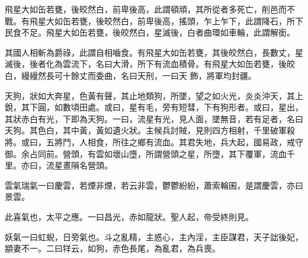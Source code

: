 \begin{pinyinscope}
 飛星大如缶若甕，後皎然白，前卑後高，此謂頓頑，其所從者多死亡，削邑而不戰。有飛星大如缶若甕，後皎然白，前卑後高，搖頭，乍上乍下，此謂降石，所下民食不足。飛星大如缶若甕，後皎然白，星滅後，白者曲環如車輪，此謂解銜。



 其國人相斬為爵祿，此謂自相嚙食。有飛星大如缶若甕，其後皎然白，長數丈，星滅後，後者化為雲流下，名曰大滑，所下有流血積骨。有飛星大如缶若甕，後皎白，縵縵然長可十餘丈而委曲，名曰天刑，一曰天
 飾，將軍均封疆。



 天狗，狀如大奔星，色黃有聲，其止地類狗，所墜，望之如火光，炎炎沖天，其上銳，其下圓，如數頃田處。或曰，星有毛，旁有短彗，下有狗形者。或曰，星出，其狀赤白有光，下即為天狗。一曰，流星有光，見人面，墜無音，若有足者，名曰天狗。其色白，其中黃，黃如遺火狀。主候兵討賊，見則四方相射，千里破軍殺將。或曰，五將鬥，人相食，所往之鄉有流血。其君失地，兵大起，國易政，戒守御。余占同前。營頭，有雲如壞山墮，所謂營頭之星，所墮，其下覆軍，流血千里。亦曰，流星晝隕名營頭。



 雲氣瑞氣一曰慶雲，若煙非煙，若云非雲，鬱鬱紛紛，蕭索輪囷，是謂慶雲，亦曰景雲。



 此喜氣也，太平之應。一曰昌光，赤如龍狀。聖人起，帝受終則見。



 妖氣一曰虹蜺，日旁氣也。斗之亂精，主惑心，主內淫，主臣謀君，天子詘後妃，顓妻不一。二曰䍧云，如狗，赤色長尾，為亂君，為兵喪。



\end{pinyinscope}